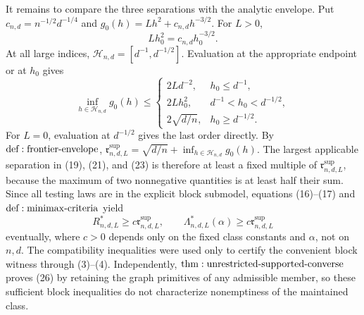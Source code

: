 It remains to compare the three separations with the analytic envelope.  Put \(c_{n,d}=n^{-1/2}d^{-1/4}\) and \(g_0(h)=Lh^2+c_{n,d}h^{-3/2}\).  For \(L>0\),
\[
 Lh_0^2=c_{n,d}h_0^{-3/2}.
\tag{24}
\]
At all large indices, \(\mathcal H_{n,d}=[d^{-1},d^{-1/2}]\).  Evaluation at the appropriate endpoint or at \(h_0\) gives
\[
 \inf_{h\in\mathcal H_{n,d}}g_0(h)
 \leq
 \begin{cases}
 2Ld^{-2},&h_0\leq d^{-1},\\
 2Lh_0^2,&d^{-1}<h_0<d^{-1/2},\\
 2\sqrt{d/n},&h_0\geq d^{-1/2}.
 \end{cases}
\tag{25}
\]
For \(L=0\), evaluation at \(d^{-1/2}\) gives the last order directly.  By \({\rm def:frontier\text{-}envelope}\), \(\mathfrak r^{\mathrm{sup}}_{n,d,L}=\sqrt{d/n}+\inf_{h\in\mathcal H_{n,d}}g_0(h)\).  The largest applicable separation in (19), (21), and (23) is therefore at least a fixed multiple of \(\mathfrak r^{\mathrm{sup}}_{n,d,L}\), because the maximum of two nonnegative quantities is at least half their sum.  Since all testing laws are in the explicit block submodel, equations (16)--(17) and \({\rm def:minimax\text{-}criteria}\) yield
\[
 R^*_{n,d,L}\geq c\mathfrak r^{\mathrm{sup}}_{n,d,L},
 \qquad
 \Lambda^*_{n,d,L}(\alpha)\geq c\mathfrak r^{\mathrm{sup}}_{n,d,L}
\tag{26}
\]
eventually, where \(c>0\) depends only on the fixed class constants and \(\alpha\), not on \(n,d\).  The compatibility inequalities were used only to certify the convenient block witness through (3)--(4).  Independently, \({\rm thm:unrestricted\text{-}supported\text{-}converse}\) proves (26) by retaining the graph primitives of any admissible member, so these sufficient block inequalities do not characterize nonemptiness of the maintained class.